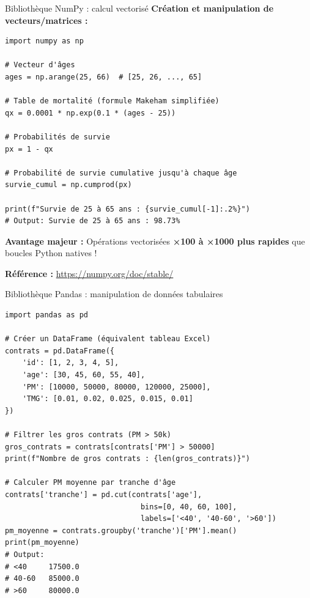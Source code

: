 \documentclass[10pt,aspectratio=169]{beamer}
\newcommand{\highlight}[1]{\textbf{\color{rougeactu}#1}}
\begin{document}
\begin{frame}[fragile]{Bibliothèque NumPy : calcul vectorisé}
\textbf{Création et manipulation de vecteurs/matrices :}

\begin{lstlisting}
import numpy as np

# Vecteur d'âges
ages = np.arange(25, 66)  # [25, 26, ..., 65]

# Table de mortalité (formule Makeham simplifiée)
qx = 0.0001 * np.exp(0.1 * (ages - 25))

# Probabilités de survie
px = 1 - qx

# Probabilité de survie cumulative jusqu'à chaque âge
survie_cumul = np.cumprod(px)

print(f"Survie de 25 à 65 ans : {survie_cumul[-1]:.2%}")
# Output: Survie de 25 à 65 ans : 98.73%
\end{lstlisting}

\vspace{0.3cm}
\textbf{Avantage majeur :} Opérations vectorisées \highlight{×100 à ×1000 plus rapides} que boucles Python natives !

\textbf{Référence :} \url{https://numpy.org/doc/stable/}
\end{frame}

\begin{frame}[fragile]{Bibliothèque Pandas : manipulation de données tabulaires}
\begin{lstlisting}
import pandas as pd

# Créer un DataFrame (équivalent tableau Excel)
contrats = pd.DataFrame({
    'id': [1, 2, 3, 4, 5],
    'age': [30, 45, 60, 55, 40],
    'PM': [10000, 50000, 80000, 120000, 25000],
    'TMG': [0.01, 0.02, 0.025, 0.015, 0.01]
})

# Filtrer les gros contrats (PM > 50k)
gros_contrats = contrats[contrats['PM'] > 50000]
print(f"Nombre de gros contrats : {len(gros_contrats)}")

# Calculer PM moyenne par tranche d'âge
contrats['tranche'] = pd.cut(contrats['age'], 
                               bins=[0, 40, 60, 100],
                               labels=['<40', '40-60', '>60'])
pm_moyenne = contrats.groupby('tranche')['PM'].mean()
print(pm_moyenne)
# Output:
# <40     17500.0
# 40-60   85000.0
# >60     80000.0
\end{lstlisting}
\end{frame}
\end{document}
